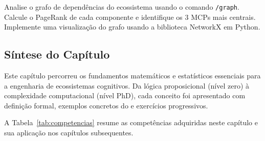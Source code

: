 \begin{exercicio}
    Analise o grafo de dependências do ecossistema usando o comando
    \lstinline{/graph}. Calcule o PageRank de cada componente e identifique
    os 3 MCPs mais centrais. Implemente uma visualização do grafo usando
    a biblioteca NetworkX em Python.
\end{exercicio}

\subsection{Síntese do Capítulo}

Este capítulo percorreu os fundamentos matemáticos e estatísticos
essenciais para a engenharia de ecossistemas cognitivos. Da lógica
proposicional (nível zero) à complexidade computacional (nível PhD), cada
conceito foi apresentado com definição formal, exemplos concretos do
\opencodeeco{} e exercícios progressivos.

A Tabela~\ref{tab:competencias} resume as competências adquiridas neste
capítulo e sua aplicação nos capítulos subsequentes.

\begin{table}[htb]
    \centering
    \small
    \caption{Competências adquiridas e aplicações futuras}
\end{table}

